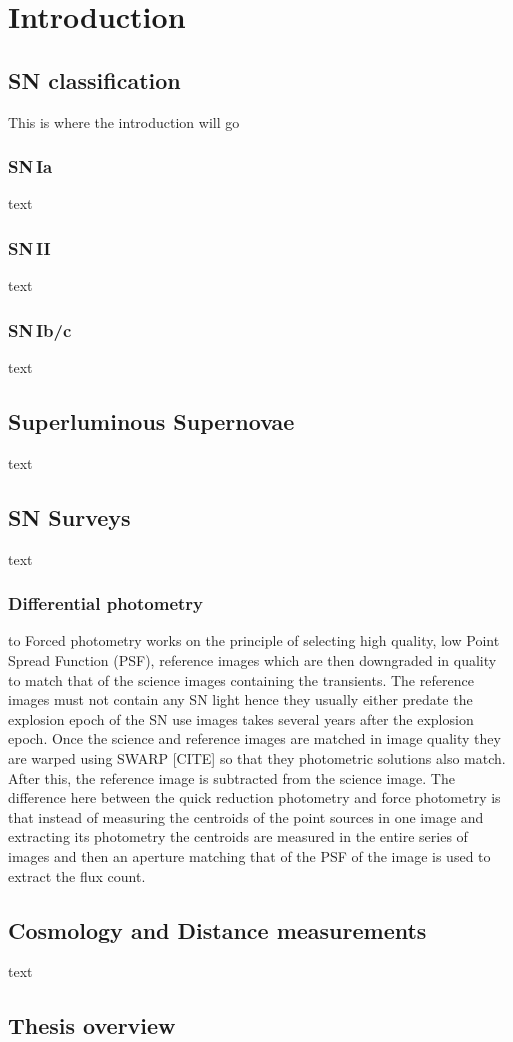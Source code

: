 
\chapter{Introduction} %
\label{Chapter1}


\section{SN classification}
This is where the introduction will go

\subsection{SN\,Ia}
text

\subsection{SN\,II}
text

\subsection{SN\,Ib/c}
text

\section{Superluminous Supernovae}
text

\section{SN Surveys}
text

\subsection{Differential photometry}
to Forced photometry works on the principle of selecting high quality, low Point Spread Function (PSF), reference images which are then downgraded in quality to match that of the science images containing the transients. The reference images must not contain any SN light hence they usually either predate the explosion epoch of the SN use images takes several years after the explosion epoch. Once the science and reference images are matched in image quality they are warped using SWARP [CITE] so that they photometric solutions also match. After this, the reference image is subtracted from the science image. The difference here between the quick reduction photometry and force photometry is that instead of measuring the centroids of the point sources in one image and extracting its photometry the centroids are measured in the entire series of images and then an aperture matching that of the PSF of the image is used to extract the flux count.

\section{Cosmology and Distance measurements}
text

\section{Thesis overview}
